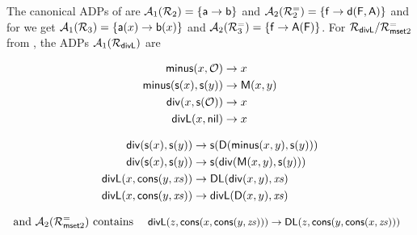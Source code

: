 \begin{example}\label{ADP-Divl}
    The canonical ADPs
    of  are $\mathcal{A}_{1}(\mathcal{R}_2) = \{ \mathsf{a}
    \to \mathsf{b}\}$
    and $\mathcal{A}_{2}(\mathcal{R}_2^{=}) = \{\mathsf{f} \to
    \mathsf{d}(\mathsf{F},\mathsf{A})\}$ and for
     we get $\mathcal{A}_{1}(\mathcal{R}_3) = \{ \mathsf{a}(x)
    \to \mathsf{b}(x)\}$
    and $\mathcal{A}_{2}(\mathcal{R}_3^{=}) = \{\mathsf{f} \to
    \mathsf{A}(\mathsf{F})\}$.
    For $\mathcal{R}_{\mathsf{divL}}/\mathcal{R}^{=}_{\mathsf{mset} 2}$ from ,
    the ADPs $\mathcal{A}_{1}(\mathcal{R}_{\mathsf{divL}})$ are

\vspace*{-.4cm}
    
    {\footnotesize
    \hspace*{-.7cm}\begin{minipage}[t]{5.1cm}
        \begin{align}
            \label{R-div-adp-2} \mathsf{minus}(x,\mathcal{O}) &\to x\\
            \label{R-div-adp-1} \mathsf{minus}(\mathsf{s}(x),\mathsf{s}(y)) &\to \mathsf{M}(x,y) \\
            \label{R-div-adp-3} \mathsf{div}(x,\mathsf{s}(\mathcal{O})) &\to x\\
            \label{R-div-adp-4} \mathsf{divL}(x,\mathsf{nil}) &\to x \!
        \end{align}
    \end{minipage}
    \begin{minipage}[t]{7.5cm}
        \begin{align}
            \label{R-div-adp-5} \mathsf{div}(\mathsf{s}(x),\mathsf{s}(y)) &\to \mathsf{s}(\mathsf{D}(\mathsf{minus}(x,y),\mathsf{s}(y)))\\
            \label{R-div-adp-6} \mathsf{div}(\mathsf{s}(x),\mathsf{s}(y)) &\to \mathsf{s}(\mathsf{div}(\mathsf{M}(x,y),\mathsf{s}(y)))\\
            \label{R-div-adp-7} \mathsf{divL}(x,\mathsf{cons}(y,\mathit{xs})) &\to \mathsf{DL}(\mathsf{div}(x,y),\mathit{xs}) \\
            \label{R-div-adp-8} \mathsf{divL}(x,\mathsf{cons}(y,\mathit{xs})) &\to \mathsf{divL}(\mathsf{D}(x,y),\mathit{xs}) \!
        \end{align}
    \end{minipage}}
    
    \vspace*{-.1cm}
   
  
    \begin{align}
      \label{B-com-adp-2}
      \hspace*{-.2cm}
         \text{and $\ADPairBase{\R^{=}_{\tset 2}}$ contains 
      {\small $\tdivl(z, \tcons(x, \tcons(y,\zs))) \to \tDL(z, \tcons(y, \tcons(x,\zs)))$}}
    \end{align}
\end{example}


